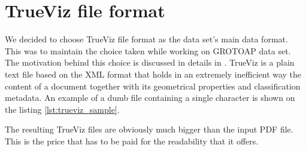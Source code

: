 \section{TrueViz file format} \label{sec:trueviz_file_format}
We decided to choose TrueViz file format as the data set's main data format. This was to maintain the choice taken while working on GROTOAP data set. The motivation behind this choice is discussed in details in \cite{Tkaczyk2012}. TrueViz is a plain text file based on the XML format that holds in an extremely inefficient way the content of a document together with its geometrical properties and classification metadata. An example of a dumb file containing a single character is shown on the listing \ref{lst:trueviz_sample}.

The resulting TrueViz files are obviously much bigger than the input PDF file. This is the price that has to be paid for the readability that it offers.

